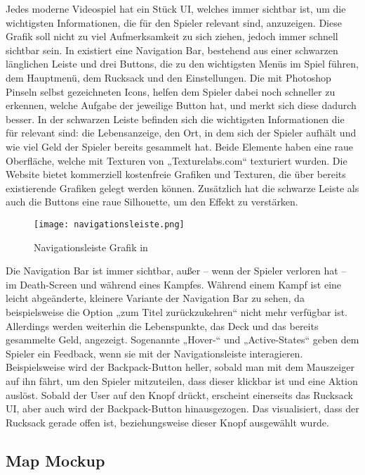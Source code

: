 Jedes moderne Videospiel hat ein Stück UI, welches immer sichtbar ist, um die wichtigsten Informationen, die für den Spieler relevant sind, anzuzeigen. Diese Grafik soll nicht zu viel Aufmerksamkeit zu sich ziehen, jedoch immer schnell sichtbar sein.
In \FF existiert eine Navigation Bar, bestehend aus einer schwarzen länglichen Leiste und drei Buttons, die zu den wichtigsten Menüs im Spiel führen, dem Hauptmenü, dem Rucksack und den Einstellungen. Die mit Photoshop Pinseln selbst gezeichneten Icons, helfen dem Spieler dabei noch schneller zu erkennen, welche Aufgabe der jeweilige Button hat, und merkt sich diese dadurch besser. In der schwarzen Leiste befinden sich die wichtigsten Informationen die für \FF relevant sind: die Lebensanzeige, den Ort, in dem sich der Spieler aufhält und wie viel Geld der Spieler bereits gesammelt hat. Beide Elemente haben eine raue Oberfläche, welche mit Texturen von „Texturelabs.com“ texturiert wurden. Die Website bietet kommerziell kostenfreie Grafiken und Texturen, die über bereits existierende Grafiken gelegt werden können. Zusätzlich hat die schwarze Leiste als auch die Buttons eine raue Silhouette, um den Effekt zu verstärken.

\begin{figure}[H]
    \centering
    \texttt{[image: navigationsleiste.png]}
    \caption{Navigationsleiste Grafik in \FF}
\end{figure}

Die Navigation Bar ist immer sichtbar, außer – wenn der Spieler verloren hat – im Death-Screen und während eines Kampfes. Während einem Kampf ist eine leicht abgeänderte, kleinere Variante der Navigation Bar zu sehen, da beispielsweise die Option „zum Titel zurückzukehren“ nicht mehr verfügbar ist. Allerdings werden weiterhin die Lebenspunkte, das Deck und das bereits gesammelte Geld, angezeigt.
Sogenannte „Hover-“ und „Active-States“ geben dem Spieler ein Feedback, wenn sie mit der Navigationsleiste interagieren. Beispielsweise wird der Backpack-Button heller, sobald man mit dem Mauszeiger auf ihn fährt, um den Spieler mitzuteilen, dass dieser klickbar ist und eine Aktion auslöst. Sobald der User auf den Knopf drückt, erscheint einerseits das Rucksack UI, aber auch wird der Backpack-Button hinausgezogen. Das visualisiert, dass der Rucksack gerade offen ist, beziehungsweise dieser Knopf ausgewählt wurde.

\subsection{Map Mockup}


